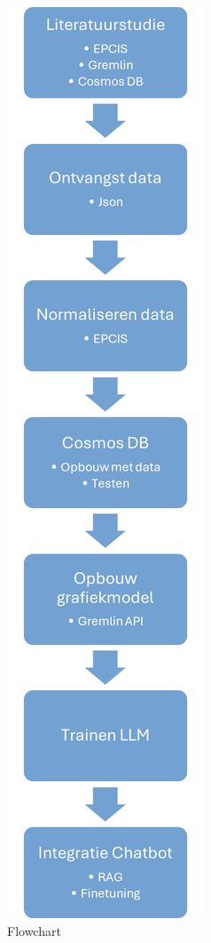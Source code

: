 \begin{figure}[h!]
    \centering
    \includegraphics{../graphics/flowchart.png}
    \caption{\label{fig:chart}Flowchart}
\end{figure}


